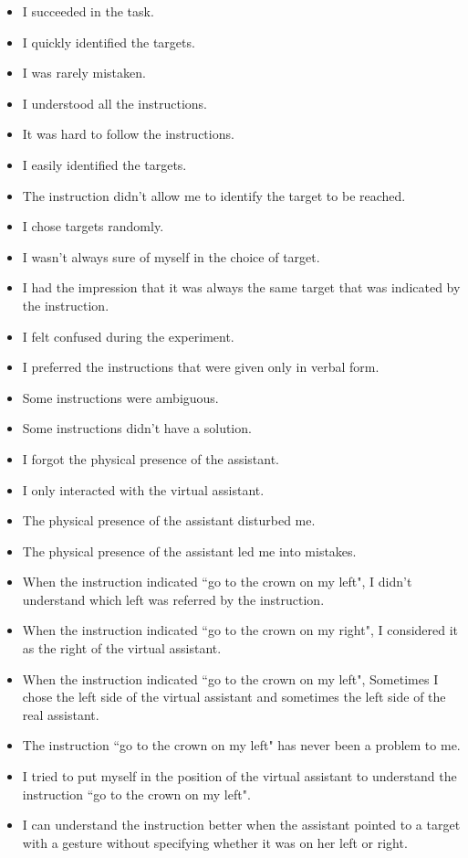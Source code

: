 \begin{appendices}
\begin{itemize}
	\item I succeeded in the task.
\item I quickly identified the targets.
\item I was rarely mistaken.
\item I understood all the instructions.
\item It was hard to follow the instructions.
\item I easily identified the targets.
\item The instruction didn't allow me to identify the target to be reached.
\item I chose targets randomly.
\item I wasn't always sure of myself in the choice of target.
\item I had the impression that it was always the same target that was indicated by the instruction.
\item I felt confused during the experiment.
\item I preferred the instructions that were given only in verbal form.
\item Some instructions were ambiguous.
\item Some instructions didn't have a solution.
\item I forgot the physical presence of the assistant.
\item I only interacted with the virtual assistant.
\item The physical presence of the assistant disturbed me.
\item The physical presence of the assistant led me into mistakes.
\item When the instruction indicated ``go to the crown on my left", I didn't understand which left was referred by the instruction.
\item When the instruction indicated ``go to the crown on my right", I considered it as the right of the virtual assistant.
\item When the instruction indicated ``go to the crown on my left", Sometimes I chose the left side of the virtual assistant and sometimes the left side of the real assistant.
\item The instruction ``go to the crown on my left" has never been a problem to me.
\item I tried to put myself in the position of the virtual assistant to understand the instruction ``go to the crown on my left".
\item I can understand the instruction better when the assistant pointed to a target with a gesture without specifying whether it was on her left or right.

\end{itemize}
\end{appendices}
